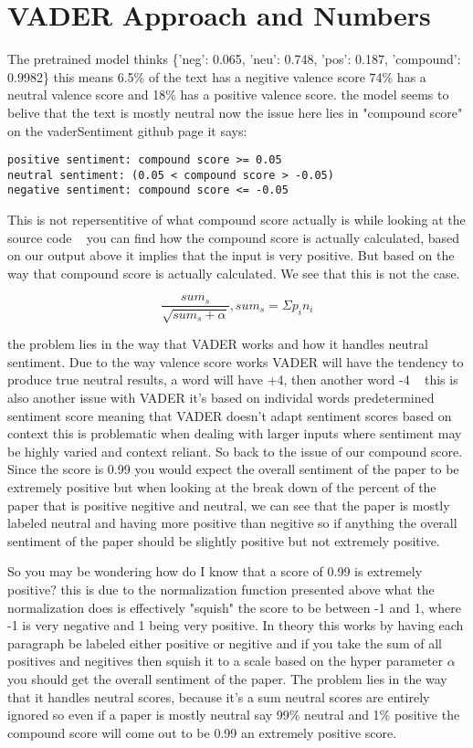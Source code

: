 \documentclass[12pt]{article}
\begin{document}
\newpage
\section{VADER Approach and Numbers}
The pretrained model thinks \{'neg': 0.065, 'neu': 0.748, 'pos': 0.187, 'compound': 0.9982\}
this means 6.5\% of the text has a negitive valence
score 74\% has a neutral valence score and 18\% has a positive
valence score.
the model seems to belive that the text is mostly neutral
now the issue here lies in "compound score"
on the vaderSentiment github page it says:
\begin{verbatim}
positive sentiment: compound score >= 0.05
neutral sentiment: (0.05 < compound score > -0.05) 
negative sentiment: compound score <= -0.05
\end{verbatim}
This is not repersentitive of what compound score actually is while looking
at the source code ~\cite{vadercode}
you can find how the compound score is actually calculated, based on our
output above it implies that the input is very positive. But based on 
the way that compound score is actually calculated. We see that this is
not the case.

$$
\frac{sum_s}{\sqrt{sum_s+\alpha}}, sum_s = \Sigma{}p_i n_i
$$

the problem lies in the way that VADER works and how it handles neutral
sentiment. Due to the way valence score works VADER will have the tendency
to produce true neutral results, a word will have +4, then another word -4 ~\cite{vadercode}
this is also another issue with VADER it's based on individal words predetermined
sentiment score meaning that VADER doesn't adapt sentiment scores based on context
this is problematic when dealing with larger inputs where sentiment may be highly varied
and context reliant. So back to the issue of our compound score.
Since the score is 0.99 you would expect the overall sentiment of the paper to be
extremely positive but when looking at the break down of the percent of the paper
that is positive negitive and neutral, we can see that the paper is mostly
labeled neutral and having more positive than negitive so if anything the overall
sentiment of the paper should be slightly positive but not extremely positive.

So you may be wondering how do I know that a score of 0.99 is extremely positive?
this is due to the normalization function presented above what the normalization
does is effectively "squish" the score to be between -1 and 1, where -1 is very 
negative and 1 being very positive. In theory this works by having each paragraph
be labeled either positive or negitive and if you take the sum of all positives and
negitives then squish it to a scale based on the hyper parameter $\alpha$ you
should get the overall sentiment of the paper. The problem lies in the way that it
handles neutral scores, because it's a sum neutral scores are entirely ignored
so even if a paper is mostly neutral say 99\% neutral and 1\% positive the compound
score will come out to be 0.99 an extremely positive score. 
\end{document}

